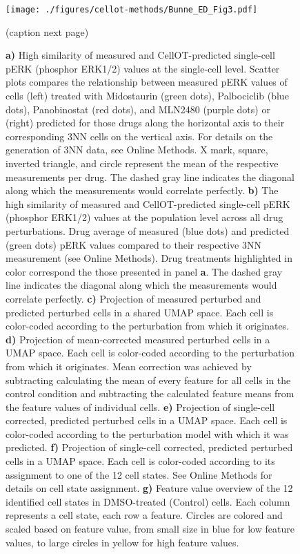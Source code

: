 \begin{figure}[b!]
    \centering
    \texttt{[image: ./figures/cellot-methods/Bunne\_ED\_Fig3.pdf]}
    \caption{(caption next page)}
    \label{supp_fig:4i_analysis_extended}
\end{figure}
\addtocounter{figure}{-1}
\begin{figure}[t!]
\caption{\textbf{a)} High similarity of measured and CellOT-predicted single-cell pERK (phosphor ERK1/2) values at the single-cell level. Scatter plots compares the relationship between measured pERK values of cells (left) treated with Midostaurin (green dots), Palbociclib (blue dots), Panobinostat (red dots), and MLN2480 (purple dots) or (right) predicted for those drugs along the horizontal axis to their corresponding 3NN cells on the vertical axis. For details on the generation of 3NN data, see Online Methods. X mark, square, inverted triangle, and circle represent the mean of the respective measurements per drug. The dashed gray line indicates the diagonal along which the measurements would correlate perfectly. \textbf{b)} The high similarity of measured and CellOT-predicted single-cell pERK (phosphor ERK1/2) values at the population level across all drug perturbations. Drug average of measured (blue dots) and predicted (green dots) pERK values compared to their respective 3NN measurement (see Online Methods). Drug treatments highlighted in color correspond the those presented in panel \textbf{a}. The dashed gray line indicates the diagonal along which the measurements would correlate perfectly. \textbf{c)} Projection of measured perturbed and predicted perturbed cells in a shared UMAP space. Each cell is color-coded according to the perturbation from which it originates. \textbf{d)} Projection of mean-corrected measured perturbed cells in a UMAP space. Each cell is color-coded according to the perturbation from which it originates. Mean correction was achieved by subtracting calculating the mean of every feature for all cells in the control condition and subtracting the calculated feature means from the feature values of individual cells. \textbf{e)} Projection of single-cell corrected, predicted perturbed cells in a UMAP space. Each cell is color-coded according to the perturbation model with which it was predicted. \textbf{f)} Projection of single-cell corrected, predicted perturbed cells in a UMAP space. Each cell is color-coded according to its assignment to one of the 12 cell states. See Online Methods for details on cell state assignment. \textbf{g)} Feature value overview of the 12 identified cell states in DMSO-treated (Control) cells. Each column represents a cell state, each row a feature. Circles are colored and scaled based on feature value, from small size in blue for low feature values, to large circles in yellow for high feature values.
}
\end{figure}
